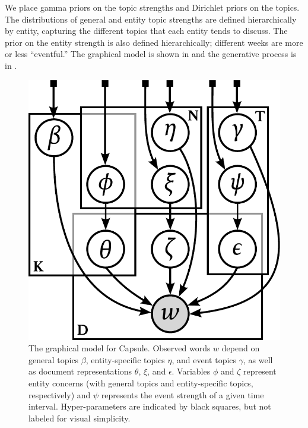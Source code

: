 We place gamma priors on the topic strengths and Dirichlet priors on
the topics. The distributions of general and entity topic strengths are defined
hierarchically by entity, capturing the different topics that each
entity tends to discuss.  The prior on the entity strength is
also defined hierarchically; different weeks are more or less
``eventful.'' The graphical model is shown in  and the generative process is in .

\begin{figure}[bt]
\centering
\includegraphics[width=0.5\linewidth]{fig/graphicalmodel.pdf}
\caption{The graphical model for Capsule.  Observed words $w$ depend on general topics $\beta$, entity-specific topics $\eta$, and event topics $\gamma$, as well as document representations $\theta$, $\xi$, and $\epsilon$.  Variables $\phi$ and $\zeta$ represent entity concerns (with general topics and entity-specific topics, respectively) and $\psi$ represents the event strength of a given time interval.  Hyper-parameters are indicated by black squares, but not labeled for visual simplicity.}
\label{fig:graphicalmodel}
\end{figure}




